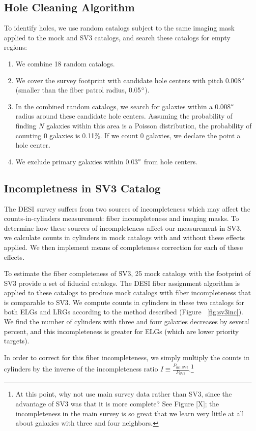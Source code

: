 \documentclass[fleqn,usenatbib]{mnras}
\begin{document}
\subsection*{Hole Cleaning Algorithm}
To identify holes, we use random catalogs subject to the same imaging mask applied to the mock and SV3 catalogs, and search these catalogs for empty regions:
\begin{enumerate}
\item  We combine 18 random catalogs.
\item We cover the survey footprint with candidate hole centers with pitch 0.008$\degree$ (smaller than the fiber patrol radius, 0.05$\degree$). 
\item In the combined random catalogs, we search for galaxies within a 0.008$\degree$ radius around these candidate hole centers. Assuming the probability of finding $N$ galaxies within this area is a Poisson distribution, the probability of counting 0 galaxies is 0.11$\%$. If we count 0 galaxies, we declare the point a hole center.
\item We exclude primary galaxies within 0.03$\degree$ from hole centers.
\end{enumerate}
\subsection*{Incompletness in SV3 Catalog}
The DESI survey suffers from two sources of incompleteness which may affect the counts-in-cylinders measurement: fiber incompleteness and imaging masks. To determine how these sources of incompleteness affect our measurement in SV3, we calculate counts in cylinders in mock catalogs with and without these effects applied. We then implement means of completeness correction for each of these effects.

To estimate the fiber completeness of SV3, 25 mock catalogs with the footprint of SV3 provide a set of fiducial catalogs. The DESI fiber assignment algorithm is applied to these catalogs to produce mock catalogs with fiber incompleteness that is comparable to SV3. We compute counts in cylinders in these two catalogs for both ELGs and LRGs according to the method described (Figure ~\ref{fig:sv3inc}). We find the number of cylinders with three and four galaxies decreases by several percent, and this incompleteness is greater for ELGs (which are lower priority targets).

In order to correct for this fiber incompleteness, we simply multiply the counts in cylinders by the inverse of the incompleteness ratio $I \equiv \frac{P_{\mathrm{inc, SV3}}}{P_{\mathrm{SV3}}}$.\footnote{At this point, why not use main survey data rather than SV3, since the advantage of SV3 was that it is more complete? See Figure [X]; the incompleteness in the main survey is so great that we learn very little at all about galaxies with three and four neighbors.}
\end{document}
